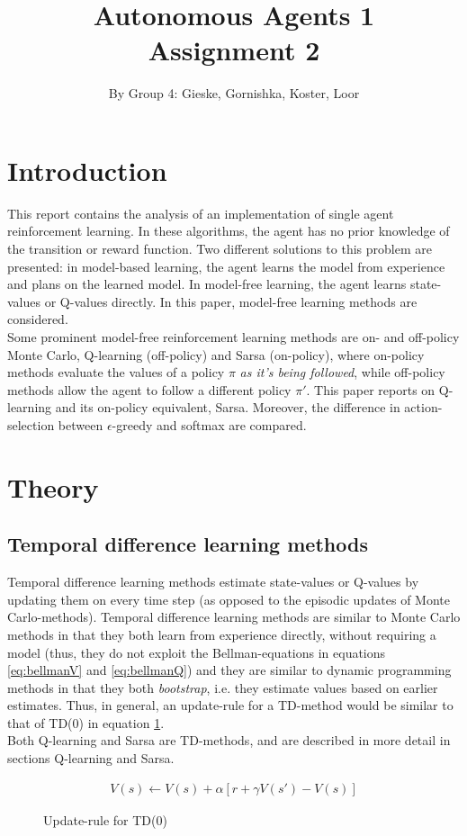 \documentclass{article}
\begin{document}
\title{Autonomous Agents 1 \\ Assignment 2}

\author{By Group 4: Gieske, Gornishka, Koster, Loor}
\maketitle

\pagebreak

\section*{Introduction}
This report contains the analysis of an implementation of single agent reinforcement learning. In these algorithms, the agent has no prior knowledge of the transition or reward function. Two different solutions to this problem are presented: in model-based learning, the agent learns the model from experience and plans on the learned model. In model-free learning, the agent learns state-values or Q-values directly. In this paper, model-free learning methods are considered.\\
Some prominent model-free reinforcement learning methods are on- and off-policy Monte Carlo, Q-learning (off-policy) and Sarsa (on-policy), where on-policy methods evaluate the values of a policy $\pi$ \textit{as it's being followed}, while off-policy methods allow the agent to follow a different policy $\pi'$. This paper reports on Q-learning and its on-policy equivalent, Sarsa. Moreover, the difference in action-selection between $\epsilon$-greedy and softmax are compared. 
\pagebreak

\section*{Theory}
\subsection*{Temporal difference learning methods}
Temporal difference learning methods estimate state-values or Q-values by updating them on every time step (as opposed to the episodic updates of Monte Carlo-methods).
Temporal difference learning methods are similar to Monte Carlo methods in that they both learn from experience directly, without requiring a model (thus, they do not exploit the Bellman-equations in equations \ref{eq:bellmanV} and \ref{eq:bellmanQ}) and they are similar to dynamic programming methods in that they both \textit{bootstrap}, i.e. they estimate values based on earlier estimates. Thus, in general, an update-rule for a TD-method would be similar to that of TD(0) in equation \ref{eq:td0}.\\
Both Q-learning and Sarsa are TD-methods, and are described in more detail in sections Q-learning and Sarsa.
\begin{figure}
\begin{align*}
V(s) \leftarrow V(s) + \alpha [r+\gamma V(s') - V(s)]
\end{align*}
\caption{Update-rule for TD(0)}
\label{eq:td0}
\end{figure}
\end{document}
